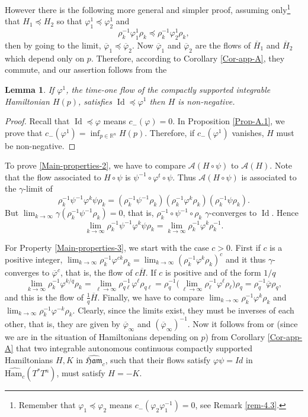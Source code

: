 \documentclass[JEP,XML,SOM,NoFloatCountersInSection,Unicode,published]{cedram}
\numberwithin{equation}{section}
\DeclareMathOperator{\Id}{Id}
\newcommand {\Ham}{{\mathfrak {Ham}}}
\newcommand {\DHam}{\mathrm{Ham}}
\let \phi \varphi
\theoremstyle{plain}
\newtheorem{lemma}[theorem]{Lemma}
\theoremstyle{definition}
\theoremstyle{remark}
\begin{document}
However there is the following more general and simpler proof, assuming only\footnote{Remember that $\varphi_1\preceq \varphi_2$ means $c_-(\varphi_2\varphi_1^{-1})=0$, see Remark \ref{rem-4.3}.} that $H_{1} \preceq H_{2}$ so that $\phi^1_{1}\preceq \phi_{2}^{1}$ and
\[
\rho_{k}^{-1}\varphi_{1}^{1}\rho_{k}\preceq \rho_{k}^{-1}\varphi_{2}^{1}\rho_{k},
\]
then by going to the limit, $\overline\varphi_{1}\preceq \overline\varphi_{2}$. Now $\overline\varphi_{1}$ and $\overline\varphi_{2}$ are the flows of $\overline H_{1}$ and $\overline H_{2}$ which depend only on $p$.
Therefore, according to Corollary \ref{Cor-app-A}, they commute, and our assertion follows from the

\begin{lemma}
If $\phi^1$, the time-one flow of the compactly supported integrable Hamiltonian $H(p)$, satisfies $\Id \preceq \phi^{1}$ then $H$ is non-negative.
\end{lemma}
\begin{proof}
Recall that $\Id \preceq \varphi$ means $c_-(\varphi)=0$. In Proposition \ref{Prop-A.1}, we prove that $c_{-}(\phi^1)= \inf_{p\in {\mathbb R} ^{n}}H(p)$. Therefore, if $c_{-}(\phi^{1})$ vanishes, $H$ must be non-negative.
\end{proof}

To prove \eqref{Main-properties-2}, we have to compare ${\mathcal A}(H\circ \psi)$ to ${\mathcal A}(H)$. Note that the flow associated to $H\circ \psi$ is $\psi^{-1}\circ \phi^{t}\circ \psi$. Thus ${\mathcal A}(H\circ \psi)$ is associated to the $\gamma$-limit of
\[
\rho_{k}^{-1}\psi^{-1}\phi^k\psi\rho_{k}=(\rho_{k}^{-1}\psi^{-1}\rho_{k}) (\rho_{k}^{-1}\phi^{k}\rho_{k}) (\rho_{k}^{-1} \psi \rho_{k}).
\]
But $\lim_{k\to \infty}\gamma (\rho_{k}^{-1}\psi^{-1}\rho_{k})=0$, that is, $\rho_k^{-1}\circ \psi^{-1}\circ \rho_k$ $\gamma$-converges to
$\Id$. Hence
\[
\lim_{k\to\infty} \rho_{k}^{-1}\psi^{-1}\phi^{k} \psi \rho_{k}=\lim_{k\to \infty } \rho_{k}^{-1}\phi^{k}\rho_{k}^{-1}.
\]

For Property \eqref{Main-properties-3}, we start with the case $c>0$. First if $c$ is a positive integer, $\lim_{k\to \infty} \rho_{k}^{-1}\phi^{ck}\rho_{k}=\lim_{k\to \infty} (\rho_{k}^{-1}\phi^{k}\rho_{k})^c$ and it thus $\gamma$-converges to $\overline \varphi^c$, that is, the flow of $c\overline H$. If $c$ is positive and of the form $1/q$
\[
\lim_{k\to \infty} \rho_{k}^{-1}\phi^{k/q}\rho_{k}= \lim_{\ell\to \infty} \rho_{q\ell}^{-1}\phi^{\ell}\rho_{q\ell}= \rho_q^{-1} \bigl (\lim_{\ell\to \infty} \rho_{\ell}^{-1}\phi^{\ell}\rho_{\ell}\bigr) \rho_q = \rho_q^{-1}\overline \varphi\rho_q,
\]
and this is the flow of $ \frac{1}{q}\overline H$. Finally,
we have to compare $\lim_{k\to \infty} \rho_{k}^{-1}\phi^k\rho_{k}$ and
$\lim_{k\to \infty} \rho_{k}^{-1}\phi^{-k}\rho_{k}$. Clearly, since the limits exist, they must be inverses of each other, that is, they are given by $\overline\varphi_\infty$ and $(\overline\varphi_\infty)^{-1}$. Now it follows from \cite{Humiliere} or (since we are in the situation of Hamiltonians depending on $p$) from Corollary \ref{Cor-app-A} that two integrable autonomous continuous compactly supported Hamiltonians $H,K$ in $\widehat\Ham_{c}$, such that their flows satisfy $\varphi\psi=Id$ in $\widehat {\DHam_c}(T^{*}T^{n})$, must satisfy $H=-K$.
\end{document}
